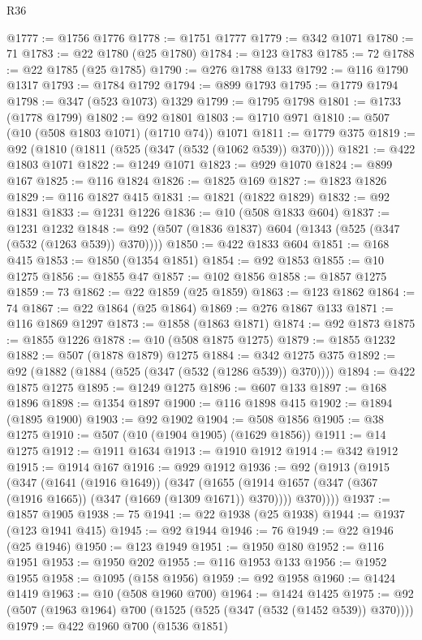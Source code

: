 \begin{lexlean}{R36}
\begin{coremodule}
@1777 := @1756 @1776
@1778 := @1751 @1777
@1779 := @342 @1071
@1780 := 71
@1783 := @22 @1780 (@25 @1780)
@1784 := @123 @1783
@1785 := 72
@1788 := @22 @1785 (@25 @1785)
@1790 := @276 @1788 @133
@1792 := @116 @1790 @1317
@1793 := @1784 @1792
@1794 := @899 @1793
@1795 := @1779 @1794
@1798 := @347 (@523 @1073) @1329
@1799 := @1795 @1798
@1801 := @1733 (@1778 @1799)
@1802 := @92 @1801
@1803 := @1710 @971
@1810 := @507 (@10 (@508 @1803 @1071) (@1710 @74)) @1071
@1811 := @1779 @375
@1819 := @92 (@1810 (@1811 (@525 (@347 (@532 (@1062 @539)) @370))))
@1821 := @422 @1803 @1071
@1822 := @1249 @1071
@1823 := @929 @1070
@1824 := @899 @167
@1825 := @116 @1824
@1826 := @1825 @169
@1827 := @1823 @1826
@1829 := @116 @1827 @415
@1831 := @1821 (@1822 @1829)
@1832 := @92 @1831
@1833 := @1231 @1226
@1836 := @10 (@508 @1833 @604)
@1837 := @1231 @1232
@1848 := @92 (@507 (@1836 @1837) @604 (@1343 (@525 (@347 (@532 (@1263 @539)) @370))))
@1850 := @422 @1833 @604
@1851 := @168 @415
@1853 := @1850 (@1354 @1851)
@1854 := @92 @1853
@1855 := @10 @1275
@1856 := @1855 @47
@1857 := @102 @1856
@1858 := @1857 @1275
@1859 := 73
@1862 := @22 @1859 (@25 @1859)
@1863 := @123 @1862
@1864 := 74
@1867 := @22 @1864 (@25 @1864)
@1869 := @276 @1867 @133
@1871 := @116 @1869 @1297
@1873 := @1858 (@1863 @1871)
@1874 := @92 @1873
@1875 := @1855 @1226
@1878 := @10 (@508 @1875 @1275)
@1879 := @1855 @1232
@1882 := @507 (@1878 @1879) @1275
@1884 := @342 @1275 @375
@1892 := @92 (@1882 (@1884 (@525 (@347 (@532 (@1286 @539)) @370))))
@1894 := @422 @1875 @1275
@1895 := @1249 @1275
@1896 := @607 @133
@1897 := @168 @1896
@1898 := @1354 @1897
@1900 := @116 @1898 @415
@1902 := @1894 (@1895 @1900)
@1903 := @92 @1902
@1904 := @508 @1856
@1905 := @38 @1275
@1910 := @507 (@10 (@1904 @1905) (@1629 @1856))
@1911 := @14 @1275
@1912 := @1911 @1634
@1913 := @1910 @1912
@1914 := @342 @1912
@1915 := @1914 @167
@1916 := @929 @1912
@1936 := @92
    (@1913
      (@1915
        (@347
          (@1641 (@1916 @1649))
          (@347
            (@1655 (@1914 @1657 (@347 (@367 (@1916 @1665)) (@347 (@1669 (@1309 @1671)) @370))))
            @370))))
@1937 := @1857 @1905
@1938 := 75
@1941 := @22 @1938 (@25 @1938)
@1944 := @1937 (@123 @1941 @415)
@1945 := @92 @1944
@1946 := 76
@1949 := @22 @1946 (@25 @1946)
@1950 := @123 @1949
@1951 := @1950 @180
@1952 := @116 @1951
@1953 := @1950 @202
@1955 := @116 @1953 @133
@1956 := @1952 @1955
@1958 := @1095 (@158 @1956)
@1959 := @92 @1958
@1960 := @1424 @1419
@1963 := @10 (@508 @1960 @700)
@1964 := @1424 @1425
@1975 := @92 (@507 (@1963 @1964) @700 (@1525 (@525 (@347 (@532 (@1452 @539)) @370))))
@1979 := @422 @1960 @700 (@1536 @1851)

\end{coremodule}
\end{lexlean}
